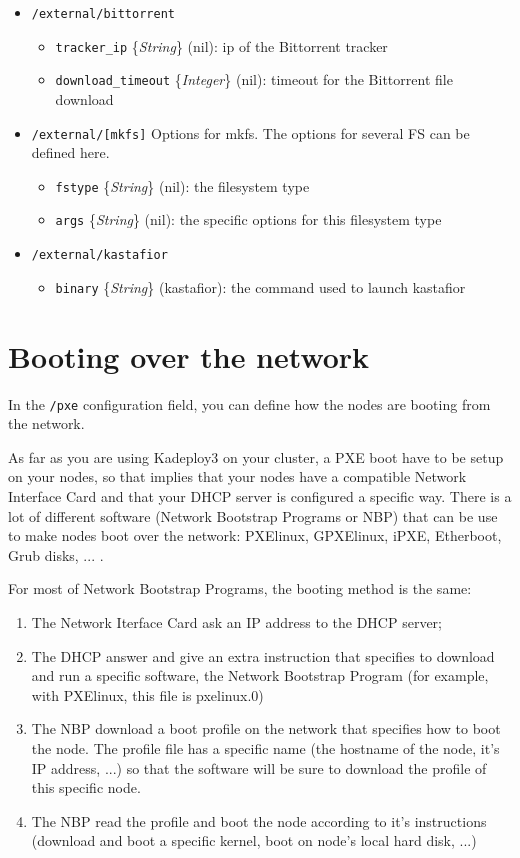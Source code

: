 \documentclass[a4wide,10pt,oneside]{book}
\newcommand{\ypath}[1]{\texttt{#1}}
\newcommand{\yfieldd}[3]{\texttt{#1} {\small\{{\emph{#2}}\}} {\small(}#3{\small)}:}
\begin{document}
\begin{itemize}
  \item \ypath{/external/bittorrent}
  \begin{itemize}
    \item \yfieldd{tracker\_ip}{String}{nil} ip of the Bittorrent tracker
    \item \yfieldd{download\_timeout}{Integer}{nil} timeout for the Bittorrent file download
  \end{itemize}

  \item \ypath{/external/[mkfs]} Options for mkfs. The options for several FS can be defined here.
  \begin{itemize}
    \item \yfieldd{fstype}{String}{nil} the filesystem type
    \item \yfieldd{args}{String}{nil} the specific options for this filesystem type
  \end{itemize}

  \item \ypath{/external/kastafior}
  \begin{itemize}
    \item \yfieldd{binary}{String}{kastafior} the command used to launch kastafior
  \end{itemize}
\end{itemize}

\section{Booting over the network}\label{sec:netboot}
In the \ypath{/pxe} configuration field, you can define how the nodes are booting from the network.

As far as you are using Kadeploy3 on your cluster, a PXE boot have to be setup on your nodes, so that implies that your nodes have a compatible Network Interface Card and that your DHCP server is configured a specific way. There is a lot of different software (Network Bootstrap Programs or NBP) that can be use to make  nodes boot over the network: PXElinux, GPXElinux, iPXE, Etherboot, Grub disks, ... .

For most of Network Bootstrap Programs, the booting method is the same:
\begin{enumerate}
  \item The Network Iterface Card ask an IP address to the DHCP server;
  \item The DHCP answer and give an extra instruction that specifies to download and run a specific software, the Network Bootstrap Program (for example, with PXElinux, this file is pxelinux.0)
  \item The NBP download a boot profile on the network that specifies how to boot the node. The profile file has a specific name (the hostname of the node, it's IP address, ...) so that the software will be sure to download the profile of this specific node.
  \item The NBP read the profile and boot the node according to it's instructions (download and boot a specific kernel, boot on node's local hard disk, ...)
\end{enumerate}
\end{document}

